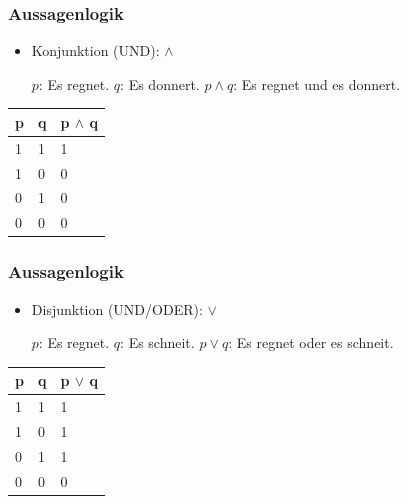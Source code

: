 \begin{frame}
\frametitle{Aussagenlogik}

\begin{itemize}
	\item Konjunktion (UND): $\land$
	
	\eal
		\ex $p$: Es regnet.
		\ex $q$: Es donnert.
		\ex $p \land q$: Es regnet und es donnert.
	\zl

\end{itemize}
	

\begin{table}
\centering

\begin{tabular}{p{2cm}|p{2cm}|p{2cm}}
\textbf{p} & \textbf{q} & \textbf{p} $\land$ \textbf{q}\\
\hline
1 & 1 & 1\\
\hline
1 & 0 & 0\\
\hline
0 & 1 & 0\\
\hline 
0 & 0 & 0\\
\end{tabular}

\end{table}	

\end{frame}



\begin{frame}
\frametitle{Aussagenlogik}

\begin{itemize}
	\item Disjunktion (UND/ODER): $\lor$

	\eal
		\ex $p$: Es regnet.
		\ex $q$: Es schneit.
		\ex $p \lor q$: Es regnet oder es schneit.
	\zl

\end{itemize}


\begin{table}
\centering

\begin{tabular}{p{2cm}|p{2cm}|p{2cm}}
\textbf{p} & \textbf{q} & \textbf{p} $\lor$ \textbf{q}\\
\hline
1 & 1 & 1\\
\hline
1 & 0 & 1\\
\hline
0 & 1 & 1\\
\hline 
0 & 0 & 0\\
\end{tabular}

\end{table}		

\end{frame}


